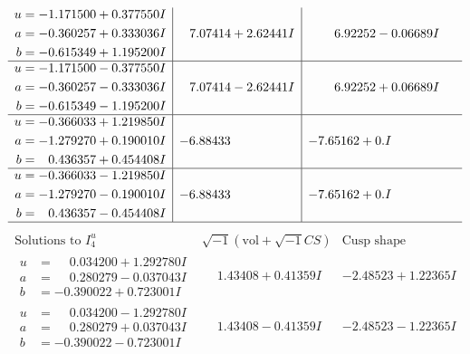 \documentclass[1p]{elsarticle_modified}
\theoremstyle{definition}
\newcommand{\I}{\sqrt{-1}}
\begin{document}
$$\begin{array}{c|c|c}
\begin{aligned}
u &= -1.171500 + 0.377550 I \\
a &= -0.360257 + 0.333036 I \\
b &= -0.615349 + 1.195200 I\end{aligned}
 & \phantom{-}7.07414 + 2.62441 I & \phantom{-}6.92252 - 0.06689 I \\ \hline\begin{aligned}
u &= -1.171500 - 0.377550 I \\
a &= -0.360257 - 0.333036 I \\
b &= -0.615349 - 1.195200 I\end{aligned}
 & \phantom{-}7.07414 - 2.62441 I & \phantom{-}6.92252 + 0.06689 I \\ \hline\begin{aligned}
u &= -0.366033 + 1.219850 I \\
a &= -1.279270 + 0.190010 I \\
b &= \phantom{-}0.436357 + 0.454408 I\end{aligned}
 & -6.88433\phantom{ +0.000000I} & -7.65162 + 0. I\phantom{ +0.000000I} \\ \hline\begin{aligned}
u &= -0.366033 - 1.219850 I \\
a &= -1.279270 - 0.190010 I \\
b &= \phantom{-}0.436357 - 0.454408 I\end{aligned}
 & -6.88433\phantom{ +0.000000I} & -7.65162 + 0. I\phantom{ +0.000000I}\\
 \hline 
 \end{array}$$\newpage$$\begin{array}{c|c|c}  
\text{Solutions to }I^u_{4}& \I (\text{vol} + \sqrt{-1}CS) & \text{Cusp shape}\\
 \hline 
\begin{aligned}
u &= \phantom{-}0.034200 + 1.292780 I \\
a &= \phantom{-}0.280279 - 0.037043 I \\
b &= -0.390022 + 0.723001 I\end{aligned}
 & \phantom{-}1.43408 + 0.41359 I & -2.48523 + 1.22365 I \\ \hline\begin{aligned}
u &= \phantom{-}0.034200 - 1.292780 I \\
a &= \phantom{-}0.280279 + 0.037043 I \\
b &= -0.390022 - 0.723001 I\end{aligned}
 & \phantom{-}1.43408 - 0.41359 I & -2.48523 - 1.22365 I \\ \hline\begin{aligned}

\end{aligned}
\end{array}$$
\end{document}
